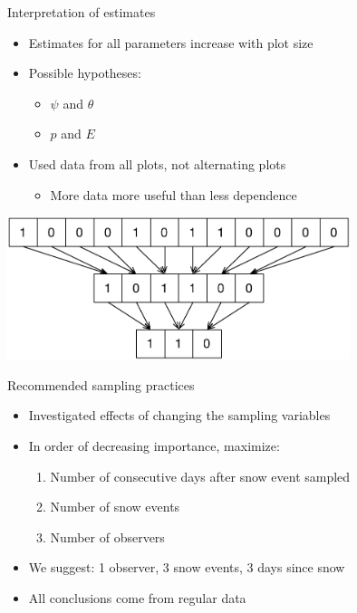 \documentclass{beamer}
\begin{document}
\begin{frame}{Interpretation of estimates}
	\begin{itemize}
		\item Estimates for all parameters increase with plot size
		\item Possible hypotheses:
		\begin{itemize}
			\item \(\psi\) and \(\theta\)
			\item \(p\) and \(E\)
		\end{itemize}
		\item Used data from all plots, not alternating plots
		\begin{itemize}
			\item More data more useful than less dependence
		\end{itemize}
	\end{itemize}
	\begin{center}
		\includegraphics[width=10cm]{Figures/Diagrams/Aggregation.pdf}
	\end{center}
\end{frame}

\begin{frame}{Recommended sampling practices}
	\begin{itemize}
		\item Investigated effects of changing the sampling variables
		\item In order of decreasing importance, maximize:
		\begin{enumerate}
			\item Number of consecutive days after snow event sampled
			\item Number of snow events
			\item Number of observers
		\end{enumerate}
		\item We suggest: 1 observer, 3 snow events, 3 days since snow
		\item All conclusions come from regular data
	\end{itemize}
\end{frame}
\end{document}
